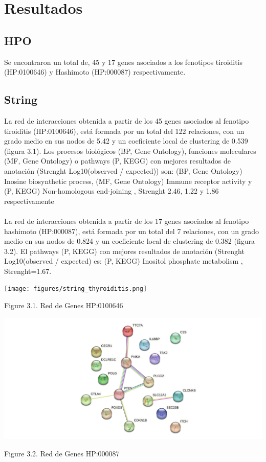 \newpage
\section{Resultados}

\subsection*{HPO}
Se encontraron un total de, 45 y 17 genes asociados a los fenotipos tiroiditis (HP:0100646) y Hashimoto (HP:000087) respectivamente.
\subsection*{String}
La red de interacciones obtenida a partir de los 45 genes asociados al fenotipo tiroiditis (HP:0100646), está formada por un total del 122 relaciones, con un grado medio en sus nodos de 5.42 y un coeficiente local de clustering de 0.539 (figura 3.1). Los procesos biológicos (BP, Gene Ontology), funciones moleculares (MF, Gene Ontology) o pathways (P, KEGG) con mejores resultados de anotación (Strenght Log10(observed / expected)) son: (BP, Gene Ontology) Inosine biosynthetic process, (MF, Gene Ontology) Immune receptor activity y (P, KEGG) Non-homologous end-joining , Strenght 2.46, 1.22 y 1.86 respectivamente \cite{StringHP:0100646} \\ \\
La red de interacciones obtenida a partir de los 17 genes asociados al fenotipo hashimoto (HP:000087), está formada por un total del 7 relaciones, con un grado medio en sus nodos de 0.824 y un coeficiente local de clustering de 0.382 (figura 3.2). El pathways (P, KEGG) con mejores resultados de anotación (Strenght Log10(observed / expected) es: (P, KEGG) Inositol phosphate metabolism , Strenght=1.67. \cite{StringHP:0000872} 
\begin{center}
 
    \texttt{[image: figures/string\_thyroiditis.png]}
    
    Figure 3.1. Red de Genes HP:0100646
\end{center}


\begin{center}
 
    \includegraphics[scale=0.4]{figures/string_hashimoto.png}
    
    Figure 3.2. Red de Genes HP:000087
\end{center}

